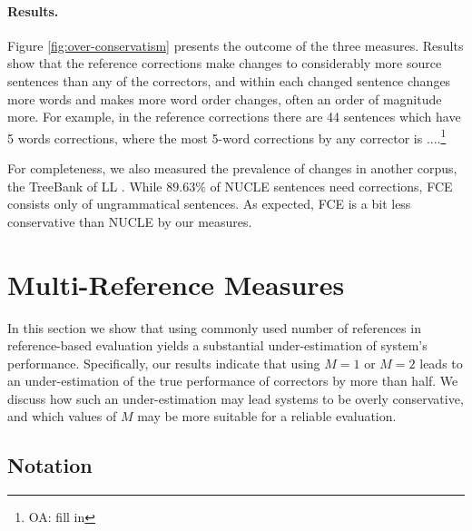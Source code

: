 \documentclass[letter,11pt]{article}
\newcommand{\oa}[1]{\footnote{\color{red}OA: #1}}
\begin{document}
\paragraph{Results.}
Figure \ref{fig:over-conservatism} presents the outcome of the three measures. 
Results show that the reference corrections make changes to considerably more source sentences than any of the correctors, and within each changed sentence changes more words and makes more word order changes, often an order of magnitude more. For example, in the reference corrections there are 44 sentences which have 5 words corrections, where the most 5-word corrections by any corrector is ....\oa{fill in}

For completeness, we also measured the prevalence of changes in
another corpus, the TreeBank of LL \cite[FCE]{yannakoudakis2011new}.
While $89.63\%$ of NUCLE sentences need corrections, FCE consists only of ungrammatical sentences. As expected, FCE is a bit less conservative than NUCLE by our measures.

		\section{Multi-Reference Measures}\label{sec:increase-reference}
		
		In this section we show that using commonly used number of references in reference-based evaluation yields a substantial under-estimation of system's performance. Specifically, our results indicate that using $M=1$ or $M=2$ leads to an under-estimation of the true performance of correctors by more than half.
		We discuss how such an under-estimation may lead systems to be
		overly conservative, and which values of $M$ may be more suitable for
		a reliable evaluation.
		
		
		
		\subsection{Notation}
		
\end{document}
